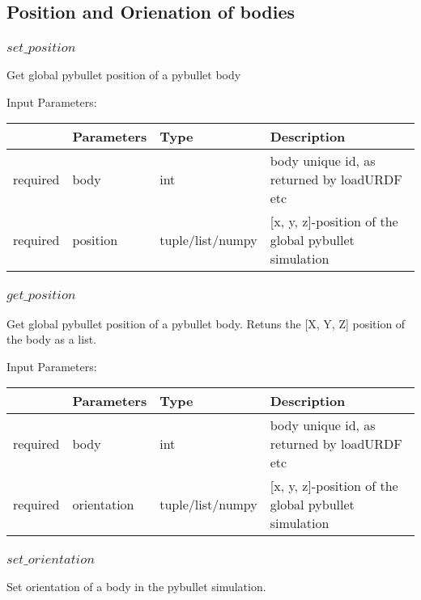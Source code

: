 \documentclass[
	ngerman,
	accentcolor=9c,%
	type=intern,
	marginpar=false
	]{tudapub}
\begin{document}
\subsection{Position and Orienation of bodies}
\subsubsection{$set\_position$}
\noindent Get global pybullet position of a pybullet body


\vspace{0.5cm}
\noindent Input Parameters:
\vspace{0.5cm}

\begin{tabular}{|p{}|p{}|p{}| p{}|}
\hline
 & \textbf{Parameters} & \textbf{Type} & \textbf{Description} \\
\hline
required & body & int & body unique id, as returned by loadURDF etc\\
\hline
required & position & tuple/list/numpy & [x, y, z]-position of the global pybullet simulation\\
\hline
\end{tabular}
\vspace{0.5cm}

\subsubsection{$get\_position$}
\noindent Get global pybullet position of a pybullet body. Retuns the [X, Y, Z] position of the body as a list.


\vspace{0.5cm}
\noindent Input Parameters:
\vspace{0.5cm}

\begin{tabular}{|p{}|p{}|p{}| p{}|}
\hline
 & \textbf{Parameters} & \textbf{Type} & \textbf{Description} \\
\hline
required & body & int & body unique id, as returned by loadURDF etc\\
\hline
required & orientation & tuple/list/numpy & [x, y, z]-position of the global pybullet simulation\\
\hline
\end{tabular}
\vspace{0.5cm}



\subsubsection{$set\_orientation$}
\noindent Set orientation of a body in the pybullet simulation.
\end{document}
